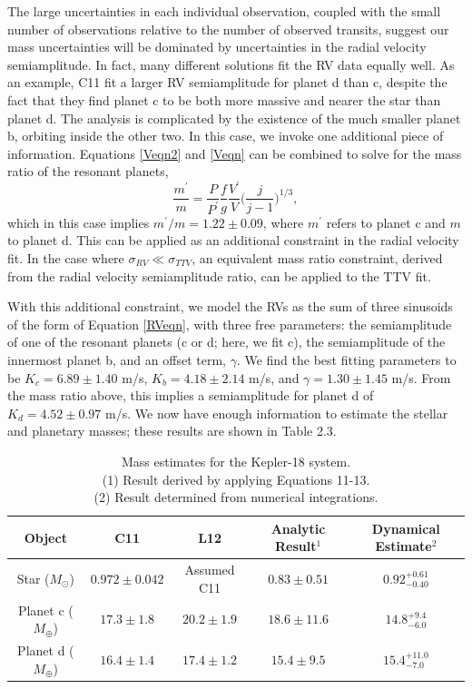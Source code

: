The large uncertainties in each individual observation, coupled with the small number of observations relative to the number of observed transits, suggest our mass uncertainties will be dominated by uncertainties in the radial velocity semiamplitude. In fact, many different solutions fit the RV data equally well. As an example, C11 fit a larger RV semiamplitude for planet d than c, despite the fact that they find planet c to be both more massive and nearer the star than planet d. The analysis is complicated by the existence of the much smaller planet b, orbiting inside the other two. In this case, we invoke one additional piece of information. Equations \ref{Veqn2} and \ref{Veqn} can be combined to solve for the mass ratio of the resonant planets, 
\begin{equation}
\frac{m^\prime}{m} = \frac{P}{P^\prime} \frac{f}{g} \frac{V^\prime}{V} \bigg(\frac{j}{j-1}\bigg)^{1/3},
\label{Mratio}
\end{equation}
which in this case implies $m^\prime/m = 1.22 \pm 0.09$, where $m^\prime$ refers to planet c and $m$ to planet d. This can be applied as an additional constraint in the radial velocity fit. In the case where $\sigma_{RV} \ll \sigma_{TTV}$, an equivalent mass ratio constraint, derived from the radial velocity semiamplitude ratio, can be applied to the TTV fit. 

With this additional constraint, we model the RVs as the sum of three sinusoids of the form of Equation \ref{RVeqn}, with three free parameters: the semiamplitude of one of the resonant planets (c or d; here, we fit c), the semiamplitude of the innermost planet b, and an offset term, $\gamma$. We find the best fitting parameters to be $K_c = 6.89 \pm 1.40$ m/s, $K_b = 4.18 \pm 2.14$ m/s, and $\gamma = 1.30 \pm 1.45$ m/s. From the mass ratio above, this implies a semiamplitude for planet d of $K_d = 4.52 \pm 0.97$ m/s. We now have enough information to estimate the stellar and planetary masses; these results are shown in Table 2.3.

\begin{table}[hbt!]
\footnotesize
\begin{center}
\begin{tabular}{ccccc}
\hline
Object & C11 & L12 & Analytic Result$^{1}$ & Dynamical Estimate$^2$ \\
\hline
        Star ($M_\odot$) & $0.972 \pm 0.042$ & Assumed C11 &  $0.83 \pm 0.51$ & $0.92 ^{+ 0.61} _{-0.40}$ \\
        Planet c ($M_\oplus$) & $17.3 \pm 1.8$ & $20.2 \pm 1.9$ & $18.6 \pm 11.6 $ & $14.8 ^{+9.4} _{-6.0}$ \\
        Planet d ($M_\oplus$) & $16.4 \pm 1.4 $ & $17.4\pm 1.2$ & $15.4 \pm 9.5 $ & $15.4 ^{+11.0} _{-7.0}$ \\
\hline
\end{tabular}   
\caption[Mass estimates for the Kepler-18 system]{Mass estimates for the Kepler-18 system. \\
(1) Result derived by applying Equations 11-13. \\
(2) Result determined from numerical integrations.}
\end{center}
\label{ExampRes}
\end{table}

